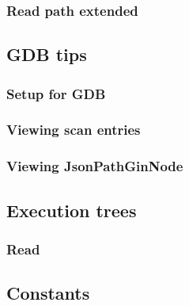 \documentclass[11pt]{article}
\begin{document}
\hypertarget{read-path-extended}{%
\subsubsection{Read path extended}\label{read-path-extended}}


\hypertarget{gdb-tips}{%
\subsection{GDB tips}\label{gdb-tips}}


\hypertarget{setup-for-gdb}{%
\subsubsection{Setup for GDB}\label{setup-for-gdb}}


\hypertarget{viewing-scan-entries}{%
\subsubsection{Viewing scan entries}\label{viewing-scan-entries}}


\hypertarget{viewing-jsonpathginnode}{%
\subsubsection{Viewing JsonPathGinNode}\label{viewing-jsonpathginnode}}


\hypertarget{execution-trees}{%
\subsection{Execution trees}\label{execution-trees}}

\hypertarget{read}{%
\subsubsection{Read}\label{read}}


\hypertarget{constants}{%
\subsection{Constants}\label{constants}}

\end{document}

